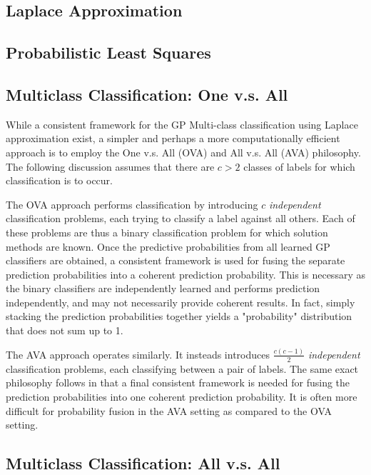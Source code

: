 		\subsection{Laplace Approximation}
			
		\subsection{Probabilistic Least Squares}
		
		\subsection{Multiclass Classification: One v.s. All}
		
			While a consistent framework for the GP Multi-class classification using Laplace approximation exist, a simpler and perhaps a more computationally efficient approach is to employ the One v.s. All (OVA) and All v.s. All (AVA) philosophy. The following discussion assumes that there are $c > 2$ classes of labels for which classification is to occur. 
			
			The OVA approach performs classification by introducing $c$ \textit{independent} classification problems, each trying to classify a label against all others. Each of these problems are thus a binary classification problem for which solution methods are known. Once the predictive probabilities from all learned GP classifiers are obtained, a consistent framework is used for fusing the separate prediction probabilities into a coherent prediction probability. This is necessary as the binary classifiers are independently learned and performs prediction independently, and may not necessarily provide coherent results. In fact, simply stacking the prediction probabilities together yields a "probability" distribution that does not sum up to 1.
			
			The AVA approach operates similarly. It insteads introduces $\frac{c (c - 1)}{2}$ \textit{independent} classification problems, each classifying between a pair of labels. The same exact philosophy follows in that a final consistent framework is needed for fusing the prediction probabilities into one coherent prediction probability. It is often more difficult for probability fusion in the AVA setting as compared to the OVA setting.
		
		\subsection{Multiclass Classification: All v.s. All}
			

